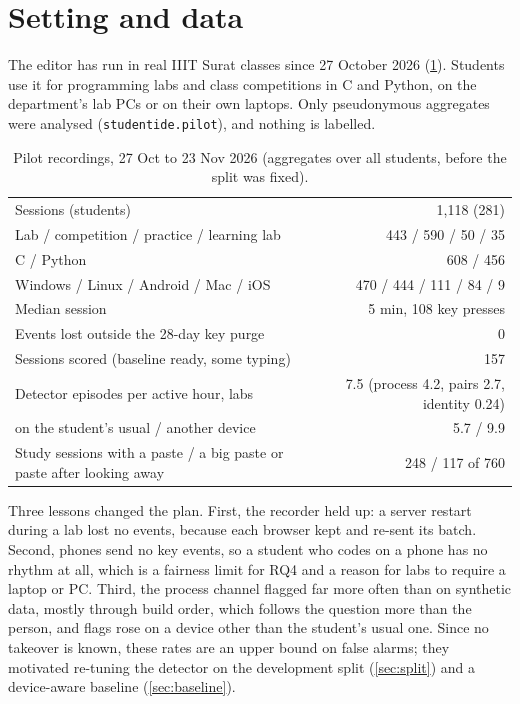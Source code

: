 \section{Setting and data}
\label{sec:pilot-data}
The editor has run in real IIIT Surat classes since 27 October 2026 (\cref{tab:pilot}).
Students use it for programming labs and class competitions in C and Python, on the
department's lab PCs or on their own laptops. Only pseudonymous aggregates were analysed
(\texttt{studentide.pilot}), and nothing is labelled.

\begin{table}[ht]
  \centering
  \caption{Pilot recordings, 27 Oct to 23 Nov 2026 (aggregates over all students, before the split was fixed).}
  \label{tab:pilot}
  \begin{tabular}{@{}lr@{}}
    \toprule
    Sessions (students) & 1,118 (281) \\
    Lab / competition / practice / learning lab & 443 / 590 / 50 / 35 \\
    C / Python & 608 / 456 \\
    Windows / Linux / Android / Mac / iOS & 470 / 444 / 111 / 84 / 9 \\
    Median session & 5 min, 108 key presses \\
    Events lost outside the 28-day key purge & 0 \\
    Sessions scored (baseline ready, some typing) & 157 \\
    Detector episodes per active hour, labs & 7.5 (process 4.2, pairs 2.7, identity 0.24) \\
    \quad on the student's usual / another device & 5.7 / 9.9 \\
    Study sessions with a paste / a big paste or paste after looking away & 248 / 117 of 760 \\
    \bottomrule
  \end{tabular}
\end{table}

Three lessons changed the plan. First, the recorder held up: a server restart during a
lab lost no events, because each browser kept and re-sent its batch. Second, phones send
no key events, so a student who codes on a phone has no rhythm at all, which is a fairness
limit for RQ4 and a reason for labs to require a laptop or PC. Third, the process channel
flagged far more often than on synthetic data, mostly through build order, which follows
the question more than the person, and flags rose on a device other than the student's
usual one. Since no takeover is known, these rates are an upper bound on false alarms;
they motivated re-tuning the detector on the development split (\cref{sec:split}) and a
device-aware baseline (\cref{sec:baseline}).

